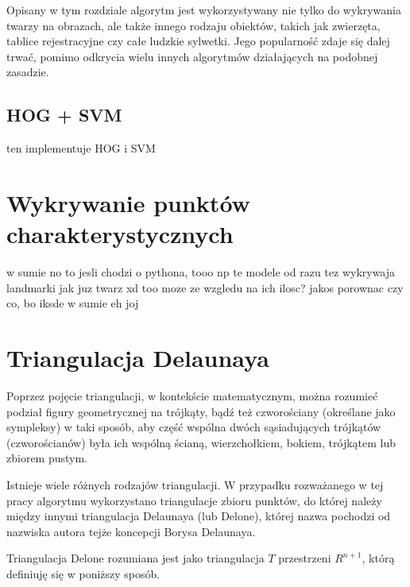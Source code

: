 Opisany w tym rozdziale algorytm jest wykorzystywany nie tylko do wykrywania twarzy na obrazach, ale także innego rodzaju obiektów, takich jak zwierzęta, tablice rejestracyjne czy całe ludzkie sylwetki. Jego popularność zdaje się dalej trwać, pomimo odkrycia wielu innych algorytmów działających na podobnej zasadzie. %



 
 
 
 
 

 
 
 



 
 

\subsection{HOG + SVM}
ten implementuje HOG i SVM


\section{Wykrywanie punktów charakterystycznych}
w sumie no to jesli chodzi o pythona, tooo np te modele od razu tez wykrywaja landmarki jak juz twarz xd too moze ze wzgledu na ich ilosc? jakos porownac czy co, bo iksde w sumie eh joj

\section{Triangulacja Delaunaya}
Poprzez pojęcie triangulacji, w kontekście matematycznym, można rozumieć podział figury geometrycznej na trójkąty, bądź też czworościany (określane jako sympleksy) w taki sposób, aby część wspólna dwóch sąsiadujących trójkątów (czworościanów) była ich wspólną ścianą, wierzchołkiem, bokiem, trójkątem lub zbiorem pustym. \cite{triangulation}

Istnieje wiele różnych rodzajów triangulacji. W przypadku rozważanego w tej pracy algorytmu wykorzystano triangulacje zbioru punktów, do której należy między innymi triangulacja Delaunaya (lub Delone), której nazwa pochodzi od nazwiska autora tejże koncepcji Borysa Delaunaya. 

Triangulacja Delone \cite{tDelone} rozumiana jest jako triangulacja $T$ przestrzeni $R^{n+1}$, którą definiuję się w poniższy sposób.

